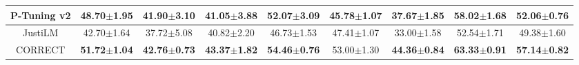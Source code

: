 \begin{table*}[t]
{\begin{tabular}{c|cc|cc|cc|cc}
                \hline
                P-Tuning v2 & 48.70$ \pm $1.95 & 41.90$ \pm $3.10 & 41.05$ \pm $3.88 & 52.07$ \pm $3.09 & 45.78$ \pm $1.07 & 37.67$ \pm $1.85 & 58.02$ \pm $1.68 & 52.06$ \pm $0.76 \\
                \hline
                JustiLM & 42.70$ \pm $1.64 & 37.72$ \pm $5.08 & 40.82$ \pm $2.20 & 46.73$ \pm $1.53 & 47.41$ \pm $1.07 & 33.00$ \pm $1.58 & 52.54$ \pm $1.71 & 49.38$ \pm $1.60 \\
                \hline
                CORRECT & \textbf{51.72}$ \pm $\textbf{1.04} & \textbf{42.76}$ \pm $\textbf{0.73} & \textbf{43.37}$ \pm $\textbf{1.82} & \textbf{54.46}$ \pm $\textbf{0.76} & 53.00$ \pm $1.30 & \textbf{44.36}$ \pm $\textbf{0.84} & \textbf{63.33}$ \pm $\textbf{0.91} & \textbf{57.14}$ \pm $\textbf{0.82} \\
			\bottomrule
		\end{tabular}
	}
	\label{table:5_shot_micro_f1}
\end{table*}